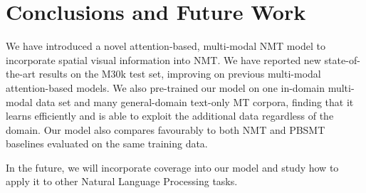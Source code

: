 \documentclass[11pt]{article}
\begin{document}
\section{Conclusions and Future Work}\label{sec:conclusions}

We have introduced a novel attention-based, multi-modal NMT model to incorporate spatial visual information into NMT.
We have reported new state-of-the-art results on the M30k test set, improving on previous multi-modal attention-based models.
We also pre-trained our model on one in-domain multi-modal data set and many general-domain text-only MT corpora, finding that it learns efficiently and is able to exploit the additional data regardless of the domain.
Our model also compares favourably to both NMT and PBSMT baselines evaluated on the same training data.

In the future, we will incorporate coverage into our model and study how to apply it to other Natural Language Processing tasks.




\end{document}
